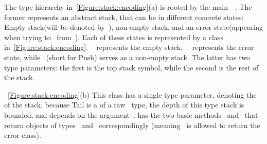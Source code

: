 The type hierarchy in~\cref{Figure:stack:encoding}(a) is rooted by the main~~.
The former represents an abstract stack, that can be in different concrete states: Empty stack(will be denoted by~),
  non-empty stack, and an error state(appearing when trying to~ from~).
Each of these states is represented by a class in~\cref{Figure:stack:encoding}.
~ represents the empty stack,~~ represents the error state,
  while ~(short for Push) serves as a non-empty stack.
The latter has two type parameters: the first is the top stack symbol, while the second is the rest of the stack.

~\cref{Figure:stack:encoding}(b) %
This class has a single type parameter, denoting the~ of the stack, because Tail is a
  of a raw~ type, the depth of this type stack is bounded, and depends on the argument~.
 has the two basic methods~ and~ that return objects of types~ and~
  correspondingly (meaning~ is allowed to return the error class).


